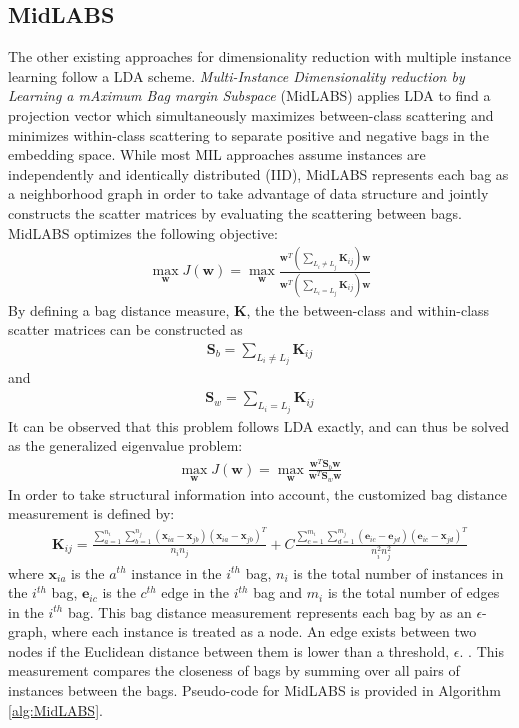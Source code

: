 \subsection{MidLABS} \label{sec:MidLABS}
The other existing approaches for dimensionality reduction with multiple instance learning follow a LDA scheme.  \textit{Multi-Instance Dimensionality reduction by Learning a mAximum Bag margin Subspace} (MidLABS) \citep{Ping2010MILDRMaxMargin} applies LDA to find a projection vector which simultaneously maximizes between-class scattering and minimizes within-class scattering to separate positive and negative bags in the embedding space.  While most MIL approaches assume instances are independently and identically distributed (IID), MidLABS represents each bag as a neighborhood graph in order to take advantage of data structure and jointly constructs  the scatter matrices by evaluating the scattering between bags. MidLABS optimizes the following objective:
\begin{align}
\max_{\bm{w}} J(\bm{w})= \max_{\bm{w}} \frac{\bm{w}^{T}(\sum_{L_{i} \neq L_{j}}\bm{K}_{ij})\bm{w}}{\bm{w}^{T}(\sum_{L_{i} = L_{j}}\bm{K}_{ij})\bm{w}}
\end{align}  
\noindent
By defining a bag distance measure, $\bm{K}$, the the between-class and within-class scatter matrices can be constructed as
\begin{align}
\bm{S}_{b} = \sum_{L_{i} \neq L_{j}}\bm{K}_{ij}
\end{align}
\noindent
and
\begin{align}
\bm{S}_{w} = \sum_{L_{i} = L_{j}}\bm{K}_{ij}
\end{align}
\noindent
It can be observed that this problem follows LDA exactly, and can thus be solved as the generalized eigenvalue problem:
\begin{align}
\max_{\bm{w}} J(\bm{w})= \max_{\bm{w}} \frac{\bm{w}^{T}\bm{S}_{b}\bm{w}}{\bm{w}^{T}\bm{S}_{w}\bm{w}}
\end{align}
\noindent
In order to take structural information into account, the customized bag distance measurement is defined by:
\begin{align}
	\bm{K}_{ij} = \frac{\sum_{a=1}^{n_{i}}\sum_{b=1}^{n_{j}} (\bm{x}_{ia} - \bm{x}_{jb})(\bm{x}_{ia} - \bm{x}_{jb})^{T}  }{n_{i}n_{j}} + C\frac{\sum_{c=1}^{m_{i}}\sum_{d=1}^{m_{j}} (\bm{e}_{ic} - \bm{e}_{jd})(\bm{e}_{ic} - \bm{x}_{jd})^{T}  }{n_{i}^{2}n_{j}^{2}}
\end{align}
\noindent
where $\bm{x}_{ia}$ is the $a^{th}$ instance in the $i^{th}$ bag, $n_i$ is the total number of instances in the $i^{th}$ bag, $\bm{e}_{ic}$ is the $c^{th}$ edge in the $i^{th}$ bag and $m_{i}$ is the total number of edges in the $i^{th}$ bag.  This bag distance measurement represents each bag by as an $\epsilon$-graph, where each instance is treated as a node.  An edge exists between two  nodes  if the Euclidean distance between them is lower than a threshold, $\epsilon$. \citep{Latham2015MIFeatureRankingThesis}.  This measurement compares the closeness of bags by summing over all pairs of instances between the bags. Pseudo-code for MidLABS is provided in Algorithm \ref{alg:MidLABS}.

